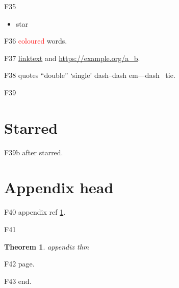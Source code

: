 \documentclass{article}
\newtheorem{theorem}{Theorem}[section]
\theoremstyle{definition}
\begin{document}
F35 \begin{itemize}\item[$\star$] star\end{itemize}

F36 \textcolor{red}{coloured} words.

F37 \href{https://example.com}{linktext} and \url{https://example.org/a_b}.

F38 quotes ``double'' `single' dash--dash em---dash ~tie.

F39 \section*{Starred}
F39b after starred.

\appendix
\section{Appendix head}\label{app}

F40 appendix ref \ref{app}.

F41 \begin{theorem}\label{t9}appendix thm\end{theorem}

F42 \pageref{t} page.

F43 end.
\end{document}

